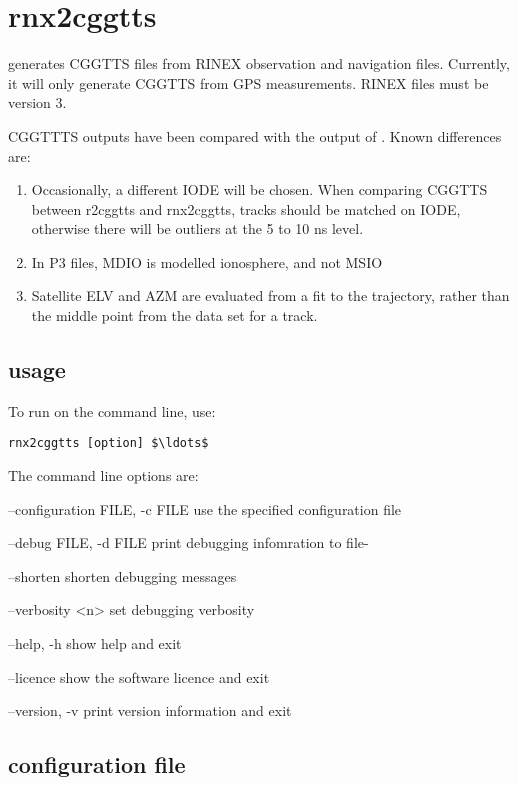 \section{rnx2cggtts \label{s:rnx2cggtts}}

 generates CGGTTS files from RINEX observation and navigation files.
Currently, it will only generate CGGTTS from GPS measurements. RINEX files must be version 3.

CGGTTTS outputs have been compared with the output of .
Known differences are:
\begin{enumerate}
\item Occasionally, a different IODE will be chosen. When comparing CGGTTS between r2cggtts and rnx2cggtts, 
tracks should be matched on IODE, otherwise there will be outliers at the 5 to 10 ns level.
\item In P3 files, MDIO is modelled ionosphere, and not MSIO
\item Satellite ELV and AZM are evaluated from a fit to the trajectory, rather than the middle point from the data set for a track. 
\end{enumerate}

\subsection{usage}

To run  on the command line, use:
\begin{lstlisting}[mathescape=true]
rnx2cggtts [option] $\ldots$
\end{lstlisting}
The command line options are:
\begin{description*}
	\item[--configuration FILE, -c  FILE] use the specified configuration file
	\item[--debug FILE, -d FILE]	print debugging infomration to file-
	\item[--shorten] shorten debugging messages
	\item[--verbosity <n>]  set debugging verbosity
	\item[--help, -h]	show help and exit
	\item[--licence] show the software licence and exit
	\item[--version, -v]	print version information and exit
\end{description*}

\subsection{configuration file}

